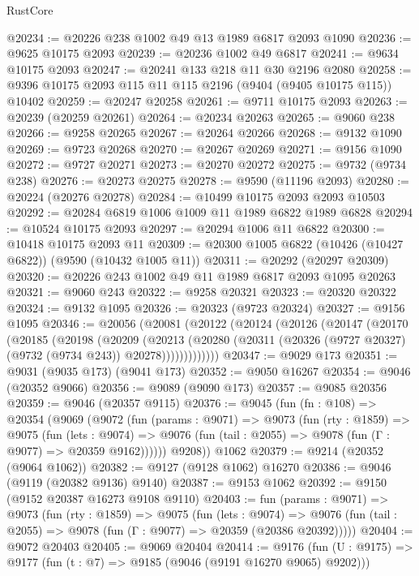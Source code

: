 \begin{lexlean}{RustCore}
\begin{coremodule}
@20234 := @20226 @238 @1002 @49 @13 @1989 @6817 @2093 @1090
@20236 := @9625 @10175 @2093
@20239 := @20236 @1002 @49 @6817
@20241 := @9634 @10175 @2093
@20247 := @20241 @133 @218 @11 @30 @2196 @2080
@20258 := @9396 @10175 @2093 @115 @11 @115 @2196 (@9404 (@9405 @10175 @115)) @10402
@20259 := @20247 @20258
@20261 := @9711 @10175 @2093
@20263 := @20239 (@20259 @20261)
@20264 := @20234 @20263
@20265 := @9060 @238
@20266 := @9258 @20265
@20267 := @20264 @20266
@20268 := @9132 @1090
@20269 := @9723 @20268
@20270 := @20267 @20269
@20271 := @9156 @1090
@20272 := @9727 @20271
@20273 := @20270 @20272
@20275 := @9732 (@9734 @238)
@20276 := @20273 @20275
@20278 := @9590 (@11196 @2093)
@20280 := @20224 (@20276 @20278)
@20284 := @10499 @10175 @2093 @2093 @10503
@20292 := @20284 @6819 @1006 @1009 @11 @1989 @6822 @1989 @6828
@20294 := @10524 @10175 @2093
@20297 := @20294 @1006 @11 @6822
@20300 := @10418 @10175 @2093 @11
@20309 := @20300 @1005 @6822 (@10426 (@10427 @6822)) (@9590 (@10432 @1005 @11))
@20311 := @20292 (@20297 @20309)
@20320 := @20226 @243 @1002 @49 @11 @1989 @6817 @2093 @1095 @20263
@20321 := @9060 @243
@20322 := @9258 @20321
@20323 := @20320 @20322
@20324 := @9132 @1095
@20326 := @20323 (@9723 @20324)
@20327 := @9156 @1095
@20346 := @20056
    (@20081
      (@20122
        (@20124
          (@20126
            (@20147
              (@20170
                (@20185
                  (@20198
                    (@20209
                      (@20213
                        (@20280
                          (@20311 (@20326 (@9727 @20327) (@9732 (@9734 @243)) @20278)))))))))))))
@20347 := @9029 @173
@20351 := @9031 (@9035 @173) (@9041 @173)
@20352 := @9050 @16267
@20354 := @9046 (@20352 @9066)
@20356 := @9089 (@9090 @173)
@20357 := @9085 @20356
@20359 := @9046 (@20357 @9115)
@20376 := @9045
    (fun (fn : @108) =>
    @20354
      (@9069
        (@9072
          (fun (params : @9071) =>
          @9073
            (fun (rty : @1859) =>
            @9075
              (fun (lets : @9074) =>
              @9076 (fun (tail : @2055) => @9078 (fun (Γ : @9077) => @20359 @9162))))))
        @9208))
    @1062
@20379 := @9214 (@20352 (@9064 @1062))
@20382 := @9127 (@9128 @1062) @16270
@20386 := @9046 (@9119 (@20382 @9136) @9140)
@20387 := @9153 @1062
@20392 := @9150 (@9152 @20387 @16273 @9108 @9110)
@20403 := fun (params : @9071) =>
  @9073
    (fun (rty : @1859) =>
    @9075
      (fun (lets : @9074) =>
      @9076 (fun (tail : @2055) => @9078 (fun (Γ : @9077) => @20359 (@20386 @20392)))))
@20404 := @9072 @20403
@20405 := @9069 @20404
@20414 := @9176
    (fun (U : @9175) => @9177 (fun (t : @7) => @9185 (@9046 (@9191 @16270 @9065) @9202)))

\end{coremodule}
\end{lexlean}
